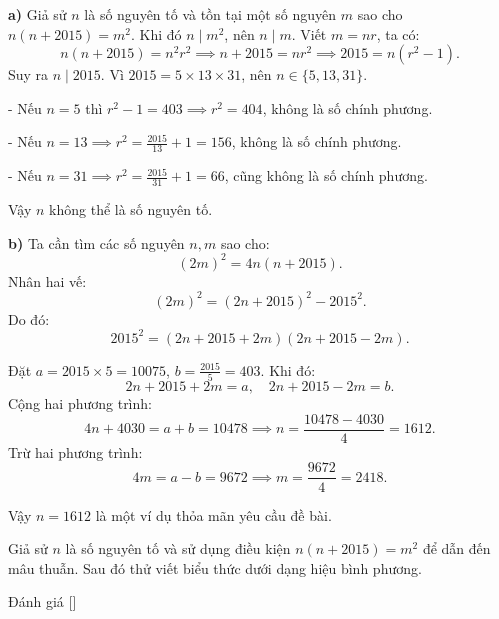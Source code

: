 \ifshowproblemandsoln
\ifshowproblem{}
\fi

\ifshowsoln
\begin{soln}\footnotemark
    \textbf{a)} Giả sử \( n \) là số nguyên tố và tồn tại một số nguyên \( m \) sao cho \( n(n + 2015) = m^2 \). Khi đó \( n \mid m^2 \), nên \( n \mid m \). Viết \( m = nr \), ta có:
    \[
        n(n + 2015) = n^2 r^2 \implies n + 2015 = nr^2 \implies 2015 = n(r^2 - 1).
    \]
    Suy ra \( n \mid 2015 \). Vì \( 2015 = 5 \times 13 \times 31 \), nên \( n \in \{5, 13, 31\} \).

    - Nếu \( n = 5 \) thì \( r^2 - 1 = 403 \implies r^2 = 404 \), không là số chính phương.

    - Nếu \( n = 13 \implies r^2 = \frac{2015}{13} + 1 = 156 \), không là số chính phương.

    - Nếu \( n = 31 \implies r^2 = \frac{2015}{31} + 1 = 66 \), cũng không là số chính phương.

    Vậy \( n \) không thể là số nguyên tố.

    \textbf{b)} Ta cần tìm các số nguyên \( n, m \) sao cho:
    \[
        (2m)^2 = 4n(n + 2015).
    \]
    Nhân hai vế:
    \[
        (2m)^2 = (2n + 2015)^2 - 2015^2.
    \]
    Do đó:
    \[
        2015^2 = (2n + 2015 + 2m)(2n + 2015 - 2m).
    \]

    Đặt \( a = 2015 \times 5 = 10075 \), \( b = \frac{2015}{5} = 403 \). Khi đó:
    \[
        2n + 2015 + 2m = a, \quad 2n + 2015 - 2m = b.
    \]
    Cộng hai phương trình:
    \[
        4n + 4030 = a + b = 10478 \implies n = \frac{10478 - 4030}{4} = 1612.
    \]
    Trừ hai phương trình:
    \[
        4m = a - b = 9672 \implies m = \frac{9672}{4} = 2418.
    \]

    Vậy \( n = 1612 \) là một ví dụ thỏa mãn yêu cầu đề bài.
\end{soln}
\fi

\ifshowhint
\begin{hint*}
    Giả sử \( n \) là số nguyên tố và sử dụng điều kiện \( n(n + 2015) = m^2 \) để dẫn đến mâu thuẫn. Sau đó thử viết biểu thức dưới dạng hiệu bình phương.
\end{hint*}
\fi

\ifshowinfo
\begin{remark*}
    Đánh giá [\textbf{}]
\end{remark*}
\newpage
\fi
